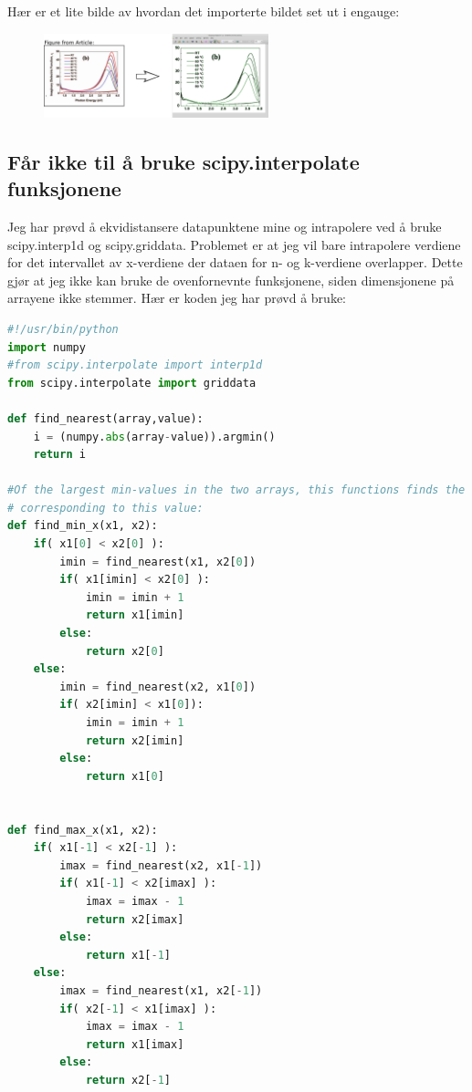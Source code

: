Hær er et lite bilde av hvordan det importerte bildet set ut i engauge:
\begin{figure} %
  \begin{center}
    \includegraphics[width=0.58\textwidth]{engaugeExample.pdf}
  \end{center}
\end{figure}
%

\newpage
\subsection{Får ikke til å bruke scipy.interpolate funksjonene}
Jeg har prøvd å ekvidistansere datapunktene mine og intrapolere ved å bruke 
scipy.interp1d og scipy.griddata. Problemet er at jeg vil bare intrapolere
verdiene for det intervallet av x-verdiene der dataen for n- og k-verdiene overlapper.
Dette gjør at jeg ikke kan bruke de ovenfornevnte funksjonene, siden dimensjonene på
arrayene ikke stemmer. Hær er koden jeg har prøvd å bruke:
\newline
\begin{lstlisting}[style=FormattedNumber,frame=none, language=python]
#!/usr/bin/python
import numpy
#from scipy.interpolate import interp1d 
from scipy.interpolate import griddata

def find_nearest(array,value):
    i = (numpy.abs(array-value)).argmin()
    return i

#Of the largest min-values in the two arrays, this functions finds the index in the other array
# corresponding to this value:
def find_min_x(x1, x2): 
    if( x1[0] < x2[0] ):
        imin = find_nearest(x1, x2[0])
        if( x1[imin] < x2[0] ):
            imin = imin + 1
            return x1[imin]
        else: 
            return x2[0]
    else:
        imin = find_nearest(x2, x1[0])
        if( x2[imin] < x1[0]):
            imin = imin + 1
            return x2[imin]
        else:
            return x1[0]


def find_max_x(x1, x2): 
    if( x1[-1] < x2[-1] ):
        imax = find_nearest(x2, x1[-1])
        if( x1[-1] < x2[imax] ):
            imax = imax - 1
            return x2[imax]
        else: 
            return x1[-1]
    else:
        imax = find_nearest(x1, x2[-1])
        if( x2[-1] < x1[imax] ):
            imax = imax - 1
            return x1[imax]
        else: 
            return x2[-1]

\end{lstlisting}
